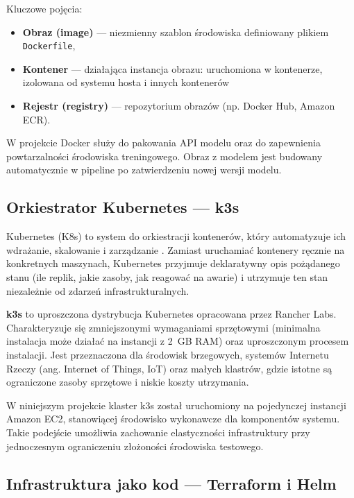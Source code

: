 Kluczowe pojęcia:
\begin{sloppypar}
\begin{itemize}
  \item \textbf{Obraz (image)} --- niezmienny szablon środowiska definiowany plikiem \texttt{Dockerfile},
  \item \textbf{Kontener} --- działająca instancja obrazu: uruchomiona w kontenerze, izolowana od systemu hosta i innych kontenerów
  \item \textbf{Rejestr (registry)} --- repozytorium obrazów (np. Docker Hub, Amazon ECR).
\end{itemize}
\end{sloppypar}

W projekcie Docker służy do pakowania API modelu oraz do zapewnienia powtarzalności środowiska treningowego. Obraz z modelem jest budowany automatycznie w pipeline po zatwierdzeniu nowej wersji modelu.

\subsection{Orkiestrator Kubernetes --- k3s}
\label{subsec:k3s}

Kubernetes (K8s) to system do orkiestracji kontenerów, który automatyzuje ich wdrażanie, skalowanie i zarządzanie \cite{burns2016borg}. Zamiast uruchamiać kontenery ręcznie na konkretnych maszynach, Kubernetes przyjmuje deklaratywny opis pożądanego stanu (ile replik, jakie zasoby, jak reagować na awarie) i utrzymuje ten stan niezależnie od zdarzeń infrastrukturalnych.

\textbf{k3s} to uproszczona dystrybucja Kubernetes opracowana przez Rancher Labs. Charakteryzuje się zmniejszonymi wymaganiami sprzętowymi (minimalna instalacja może działać na instancji z 2~GB RAM) oraz uproszczonym procesem instalacji. Jest przeznaczona dla środowisk brzegowych, systemów Internetu Rzeczy (ang. Internet of Things, IoT) oraz małych klastrów, gdzie istotne są ograniczone zasoby sprzętowe i niskie koszty utrzymania.

W niniejszym projekcie klaster k3s został uruchomiony na pojedynczej instancji Amazon EC2, stanowiącej środowisko wykonawcze dla komponentów systemu. Takie podejście umożliwia zachowanie elastyczności infrastruktury przy jednoczesnym ograniczeniu złożoności środowiska testowego.

\subsection{Infrastruktura jako kod --- Terraform i Helm}

